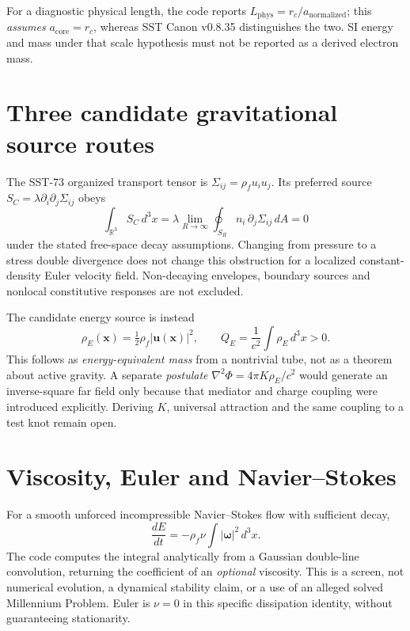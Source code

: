 \documentclass[10pt,a4paper]{article}
\begin{document}
For a diagnostic physical length, the code reports $L_{\mathrm{phys}}=r_c/a_{\mathrm{normalized}}$; this \emph{assumes} $a_{\mathrm{core}}=r_c$, whereas SST Canon v0.8.35 distinguishes the two. SI energy and mass under that scale hypothesis must not be reported as a derived electron mass.
\section{Three candidate gravitational source routes}
The SST-73 organized transport tensor is $\Sigma_{ij}=\rho_f u_i u_j$. Its preferred source $S_C=\lambda\partial_i\partial_j\Sigma_{ij}$ obeys
\begin{equation}
\int_{\mathbb{R}^3}S_C\,d^3x =
\lambda\lim_{R\rightarrow\infty}\oint_{S_R}n_i\,\partial_j\Sigma_{ij}\,dA=0
\end{equation}
under the stated free-space decay assumptions. Changing from pressure to a stress double divergence does not change this obstruction for a localized constant-density Euler velocity field. Non-decaying envelopes, boundary sources and nonlocal constitutive responses are not excluded.

The candidate energy source is instead
\begin{equation}
\rho_E(\mathbf{x})=\tfrac12\rho_f|\mathbf{u}(\mathbf{x})|^2,\qquad
Q_E=\frac{1}{c^2}\int\rho_E\,d^3x>0.
\end{equation}
This follows as \emph{energy-equivalent mass} from a nontrivial tube, not as a theorem about active gravity. A separate \emph{postulate}
$\nabla^2\Phi=4\pi K\rho_E/c^2$
would generate an inverse-square far field only because that mediator and charge coupling were introduced explicitly. Deriving $K$, universal attraction and the same coupling to a test knot remain open.
\section{Viscosity, Euler and Navier--Stokes}
For a smooth unforced incompressible Navier--Stokes flow with sufficient decay,
\begin{equation}
\frac{dE}{dt}=-\rho_f\nu\int|\boldsymbol\omega|^2\,d^3x.
\end{equation}
The code computes the integral analytically from a Gaussian double-line convolution, returning the coefficient of an \emph{optional} viscosity. This is a screen, not numerical evolution, a dynamical stability claim, or a use of an alleged solved Millennium Problem. Euler is $\nu=0$ in this specific dissipation identity, without guaranteeing stationarity.
\end{document}
